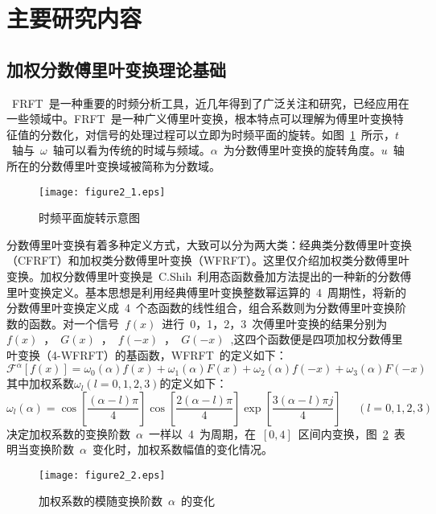 
\section{主要研究内容}
\subsection{加权分数傅里叶变换理论基础}

~FRFT~是一种重要的时频分析工具，近几年得到了广泛关注和研究，已经应用在一些领域中。FRFT~是一种广义傅里叶变换，根本特点可以理解为傅里叶变换特征值的分数化，对信号的处理过程可以立即为时频平面的旋转。如图~\ref{shipinxuanzhuan}~所示，$t$~轴与~$\omega$~轴可以看为传统的时域与频域。$\alpha$~为分数傅里叶变换的旋转角度。$u$~轴所在的分数傅里叶变换域被简称为分数域。
\begin{figure}[htbp]
\centering
\texttt{[image: figure2\_1.eps]}
\caption{时频平面旋转示意图}\vspace{-1em}\label{shipinxuanzhuan}
\end{figure}

分数傅里叶变换有着多种定义方式，大致可以分为两大类：经典类分数傅里叶变换（CFRFT）和加权类分数傅里叶变换（WFRFT）。这里仅介绍加权类分数傅里叶变换。加权分数傅里叶变换是~C.Shih~利用态函数叠加方法提出的一种新的分数傅里叶变换定义。基本思想是利用经典傅里叶变换整数幂运算的~4~周期性，将新的分数傅里叶变换定义成~4~个态函数的线性组合，组合系数则为分数傅里叶变换阶数的函数。对一个信号~$f(x)$~进行~0，1，2，3~次傅里叶变换的结果分别为~$f(x)$~，~$G(x)$~，~$f(-x)$~，~$G(-x)$~,这四个函数便是四项加权分数傅里叶变换（4-WFRFT）的基函数，WFRFT~的定义如下：
\begin{equation}
{\mathcal{F}^\alpha }\left[ {f\left( x \right)} \right] = {\omega _0}\left( \alpha  \right)f\left( x \right) + {\omega _1}\left( \alpha  \right)F\left( x \right) + {\omega _2}\left( \alpha  \right)f\left( { - x} \right) + {\omega _3}\left( \alpha  \right)F\left( { - x} \right)
\end{equation}
其中加权系数${\omega _l}(l = 0,1,2,3)$的定义如下：
\begin{equation}\label{jiaquanxishu}
{\omega _l}(\alpha ) = \cos \left[ {\frac{{(\alpha  - l)\pi }}{4}} \right]\cos \left[ {\frac{{2(\alpha  - l)\pi }}{4}} \right]\exp \left[ {\frac{{3(\alpha  - l)\pi j}}{4}} \right]\;\;\;\;\;(l = 0,1,2,3)
\end{equation}
决定加权系数的变换阶数~$\alpha$~一样以~4~为周期，在~$[0,4]$~区间内变换，图~\ref{xishubianhua}~表明当变换阶数~$\alpha$~变化时，加权系数幅值的变化情况。
\begin{figure}[htbp]
\centering
\texttt{[image: figure2\_2.eps]}
\caption{加权系数的模随变换阶数~$\alpha$~的变化}\vspace{-1em}\label{xishubianhua}
\end{figure}

